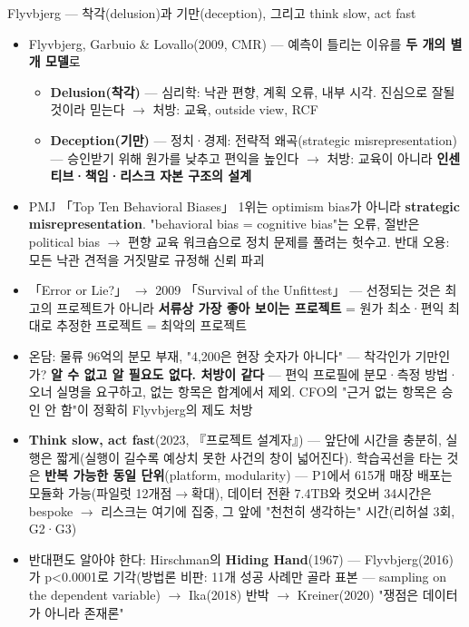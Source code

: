 \begin{frame}[allowframebreaks=1.0]{Flyvbjerg — 착각(delusion)과 기만(deception), 그리고 think slow, act fast}
\small
\begin{itemize}
\item\relax Flyvbjerg, Garbuio \& Lovallo(2009, CMR) — 예측이 틀리는 이유를 \textbf{두 개의 별개 모델}로
\par\nobreak
\begin{itemize}
\item\relax \textbf{Delusion(착각)} — 심리학: 낙관 편향, 계획 오류, 내부 시각. 진심으로 잘될 것이라 믿는다 $\rightarrow$ 처방: 교육, outside view, RCF
\item\relax \textbf{Deception(기만)} — 정치·경제: 전략적 왜곡(strategic misrepresentation) — 승인받기 위해 원가를 낮추고 편익을 높인다 $\rightarrow$ 처방: 교육이 아니라 \textbf{인센티브·책임·리스크 자본 구조의 설계}
\end{itemize}
\item{} PMJ 「Top Ten Behavioral Biases」 1위는 optimism bias가 아니라 \textbf{strategic misrepresentation}. "behavioral bias = cognitive bias"는 오류, 절반은 political bias $\rightarrow$ 편향 교육 워크숍으로 정치 문제를 풀려는 헛수고. 반대 오용: 모든 낙관 견적을 거짓말로 규정해 신뢰 파괴
\item{} 「Error or Lie?」 $\rightarrow$ 2009 「Survival of the Unfittest」 — 선정되는 것은 최고의 프로젝트가 아니라 \textbf{서류상 가장 좋아 보이는 프로젝트} = 원가 최소·편익 최대로 추정한 프로젝트 = 최악의 프로젝트
\item\relax 온담: 물류 96억의 분모 부재, "4,200은 현장 숫자가 아니다" — 착각인가 기만인가? \textbf{알 수 없고 알 필요도 없다. 처방이 같다} — 편익 프로필에 분모·측정 방법·오너 실명을 요구하고, 없는 항목은 합계에서 제외. CFO의 "근거 없는 항목은 승인 안 함"이 정확히 Flyvbjerg의 제도 처방
\item\relax \textbf{Think slow, act fast}(2023, 『프로젝트 설계자』) — 앞단에 시간을 충분히, 실행은 짧게(실행이 길수록 예상치 못한 사건의 창이 넓어진다). 학습곡선을 타는 것은 \textbf{반복 가능한 동일 단위}(platform, modularity) — P1에서 615개 매장 배포는 모듈화 가능(파일럿 12개점$\rightarrow$확대), 데이터 전환 7.4TB와 컷오버 34시간은 bespoke $\rightarrow$ 리스크는 여기에 집중, 그 앞에 "천천히 생각하는" 시간(리허설 3회, G2·G3)
\item\relax 반대편도 알아야 한다: Hirschman의 \textbf{Hiding Hand}(1967) — Flyvbjerg(2016)가 p<0.0001로 기각(방법론 비판: 11개 성공 사례만 골라 표본 — sampling on the dependent variable) $\rightarrow$ Ika(2018) 반박 $\rightarrow$ Kreiner(2020) "쟁점은 데이터가 아니라 존재론"
\end{itemize}
\end{frame}


